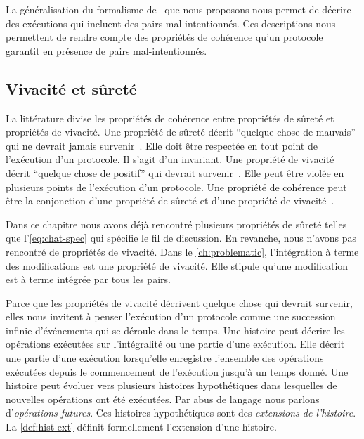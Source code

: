La généralisation du formalisme de~\textcite{burckhardt_eventualconsistency_2014} que nous proposons nous permet de décrire des exécutions qui incluent des pairs mal-intentionnés.
Ces descriptions nous permettent de rendre compte des propriétés de cohérence qu'un protocole garantit en présence de pairs mal-intentionnés.

\subsection{Vivacité et sûreté}\label{subsec:consistency-spec-liveness-safety}

La littérature divise les propriétés de cohérence entre propriétés de sûreté et propriétés de vivacité.
Une propriété de sûreté décrit \enquote{quelque chose de mauvais} qui ne devrait jamais survenir~\autocite{lamport_1977_correctness}.
Elle doit être respectée en tout point de l'exécution d'un protocole.
Il s'agit d'un invariant.
Une propriété de vivacité décrit \enquote{quelque chose de positif} qui devrait survenir~\autocite{lamport_1977_correctness}.
Elle peut être violée en plusieurs points de l'exécution d'un protocole.
Une propriété de cohérence peut être la conjonction d'une propriété de sûreté et d'une propriété de vivacité~\autocite{alpern_liveness_1985}.

Dans ce chapitre nous avons déjà rencontré plusieurs propriétés de sûreté telles que l'\autoref{eq:chat-spec} qui spécifie le fil de discussion.
En revanche, nous n'avons pas rencontré de propriétés de vivacité.
Dans le \autoref{ch:problematic}, l'intégration à terme des modifications est une propriété de vivacité.
Elle stipule qu'une modification est à terme intégrée par tous les pairs.

Parce que les propriétés de vivacité décrivent quelque chose qui devrait survenir, elles nous invitent à penser l'exécution d'un protocole comme une succession infinie d'événements qui se déroule dans le temps.
Une histoire peut décrire les opérations exécutées sur l'intégralité ou une partie d'une exécution.
Elle décrit une partie d'une exécution lorsqu'elle enregistre l'ensemble des opérations exécutées depuis le commencement de l'exécution jusqu'à un temps donné.
Une histoire peut évoluer vers plusieurs histoires hypothétiques dans lesquelles de nouvelles opérations ont été exécutées.
Par abus de langage nous parlons d'\emph{opérations futures}.
Ces histoires hypothétiques sont des \emph{extensions de l'histoire}.
La \autoref{def:hist-ext} définit formellement l'extension d'une histoire.

